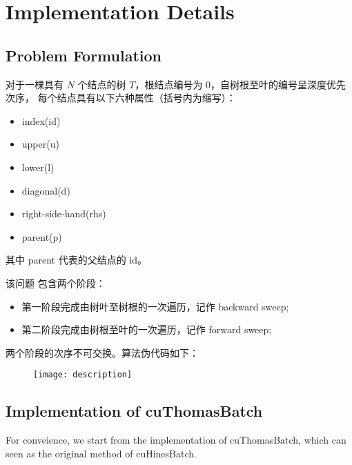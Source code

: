 
\chapter{Implementation Details}

\section{Problem Formulation}

对于一棵具有 $N$ 个结点的树 $T$，根结点编号为 0，自树根至叶的编号呈深度优先次序，
每个结点具有以下六种属性（括号内为缩写）：

\begin{itemize}
    \item index(id)
    \item upper(u)
    \item lower(l)
    \item diagonal(d)
    \item right-side-hand(rhs)
    \item parent(p)  
\end{itemize}

\vspace{1ex}
其中 parent 代表的父结点的 id。

\vspace{5ex}
该问题 包含两个阶段： 

\begin{itemize}
    \item 第一阶段完成由树叶至树根的一次遍历，记作 backward sweep;
    \item 第二阶段完成由树根至叶的一次遍历，记作 forward sweep;
\end{itemize}

\vspace{1ex}
两个阶段的次序不可交换。算法伪代码如下：

\vspace{5ex}
\begin{figure}[htbp]
    \centering
    \texttt{[image: description]}
    \label{fig:description}
\end{figure}


\vspace{10ex}
\section{Implementation of cuThomasBatch}
For conveience, we start from the implementation of cuThomasBatch, which can seen as the original method of cuHinesBatch.

